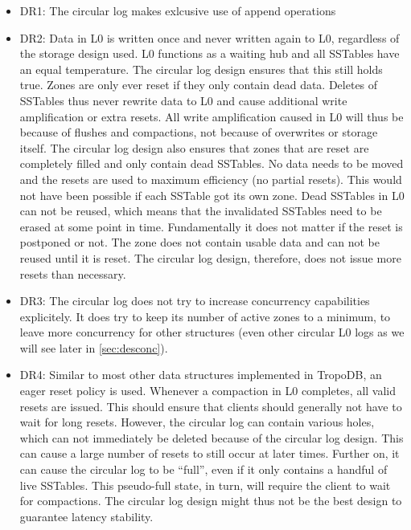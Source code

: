 \begin{itemize}
    \item DR1: The circular log makes exlcusive use of append operations
    \item DR2: Data in L0 is written once and never written again to L0, regardless of the storage design used. L0 functions as a waiting hub and all SSTables have an equal temperature. The circular log design ensures that this still holds true. Zones are only ever reset if they only contain dead data. Deletes of SSTables thus never rewrite data to L0 and cause additional write amplification or extra resets. All write amplification caused in L0 will thus be because of flushes and compactions, not because of overwrites or storage itself. The circular log design also ensures that zones that are reset are completely filled and only contain dead SSTables. No data needs to be moved and the resets are used to maximum efficiency (no partial resets). This would not have been possible if each SSTable got its own zone. Dead SSTables in L0 can not be reused, which means that the invalidated SSTables need to be erased at some point in time. Fundamentally it does not matter if the reset is postponed or not. The zone does not contain usable data and can not be reused until it is reset. The circular log design, therefore, does not issue more resets than necessary.
    \item DR3: The circular log does not try to increase concurrency capabilities explicitely. It does try to keep its number of active zones to a minimum, to leave more concurrency for other structures (even other circular L0 logs as we will see later in \autoref{sec:desconc}).
    \item DR4: Similar to most other data structures implemented in TropoDB, an eager reset policy is used. Whenever a compaction in L0 completes, all valid resets are issued. This should ensure that clients should generally not have to wait for long resets. However, the circular log can contain various holes, which can not immediately be deleted because of the circular log design. This can cause a large number of resets to still occur at later times. Further on, it can cause the circular log to be ``full'', even if it only contains a handful of live SSTables. This pseudo-full state, in turn, will require the client to wait for compactions. The circular log design might thus not be the best design to guarantee latency stability. 
\end{itemize}

